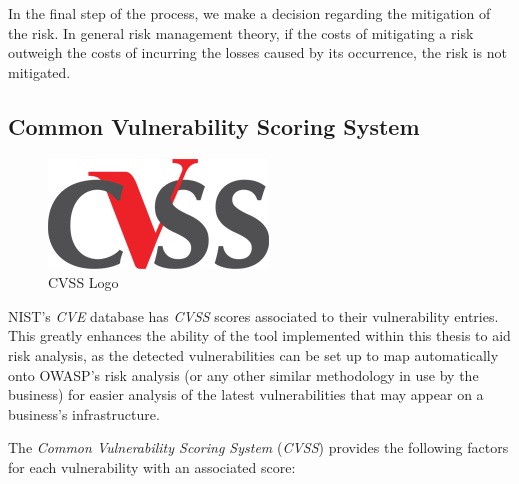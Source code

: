 \documentclass[a4paper,12pt]{article}
\begin{document}
	In the final step of the process, we make a decision regarding the mitigation of the risk. In general risk management theory, if the costs of mitigating a risk outweigh the costs of incurring the losses caused by its occurrence, the risk is not mitigated.
	
\subsection{Common Vulnerability Scoring System} \label{cvss}
 
	
	\begin{figure}
		\vspace{-10pt}
		\centering
		\includegraphics[scale=0.4]{cvss.png}
		\caption{CVSS Logo}
	\end{figure}
	
	NIST's \textit{CVE} database has \textit{CVSS} scores associated to their vulnerability entries. This greatly enhances the ability of the tool implemented within this thesis to aid risk analysis, as the detected vulnerabilities can be set up to map automatically onto OWASP's risk analysis (or any other similar methodology in use by the business) for easier analysis of the latest vulnerabilities that may appear on a business's infrastructure.
	
	The \textit{Common Vulnerability Scoring System}\cite{cvssv2} (\textit{CVSS}) provides the following factors for each vulnerability with an associated score:
	
\end{document}
